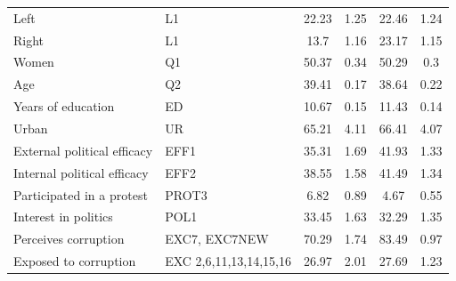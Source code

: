 \documentclass[12pt,a4]{article}\usepackage[]{graphicx}\usepackage[]{xcolor}
\begin{document}
\begin{table}[htbp!]
\begin{center}
\begin{tabular}{llcccc}
Left                                          & L1                                                                                      & 22.23    & 1.25           & 22.46    & 1.24           \\
Right                                         & L1                                                                                      & 13.7     & 1.16           & 23.17    & 1.15           \\
Women                                         & Q1                                                                                      & 50.37    & 0.34           & 50.29    & 0.3            \\
Age                                           & Q2                                                                                      & 39.41    & 0.17           & 38.64    & 0.22           \\
Years of education                            & ED                                                                                      & 10.67    & 0.15           & 11.43    & 0.14           \\
Urban                                         & UR                                                                                      & 65.21    & 4.11           & 66.41    & 4.07           \\
External political efficacy                   & EFF1                                                                                    & 35.31    & 1.69           & 41.93    & 1.33           \\
Internal political efficacy                   & EFF2                                                                                    & 38.55    & 1.58           & 41.49    & 1.34           \\
Participated in a protest                     & PROT3                                                                                   & 6.82     & 0.89           & 4.67     & 0.55           \\
Interest in politics & POL1 & 33.45 & 1.63 & 32.29 & 1.35 \\
Perceives corruption                          & EXC7, EXC7NEW                                                                           & 70.29    & 1.74           & 83.49    & 0.97           \\
Exposed to corruption                         & EXC 2,6,11,13,14,15,16                                                                  & 26.97    & 2.01           & 27.69    & 1.23           \\ 

\end{tabular}
\end{center}
\end{table}
\end{document}
